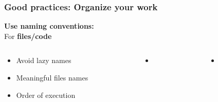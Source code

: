 \documentclass[xcolor=x11names,compress, aspectratio=169]{beamer}
\renewcommand{\(}{\begin{columns}}
\renewcommand{\)}{\end{columns}}
\newcommand{\<}[1]{\begin{column}{#1}}
\renewcommand{\>}{\end{column}}
\begin{document}
\begin{frame}
\frametitle{\textbf{Good practices:} Organize your work }
\textcolor{siap}{\textbf{Use naming conventions: } \\ }
For \textbf{files/code}\\
\begin{columns}[t]
 \begin{column}{0.3\textwidth}
    \begin{itemize}[<+->]
   \item Avoid  lazy names
   \item Meaningful files names
   \item Order of execution
    \end{itemize}
\end{column}
  \begin{column}{0.2\textwidth}
    \begin{itemize}
       \item[]
    \end{itemize}
  \end{column}
  \begin{column}{0.5\textwidth}
    \begin{itemize}
        \item[]

    \end{itemize}
  \end{column}
\end{columns}
\end{frame}
\end{document}
